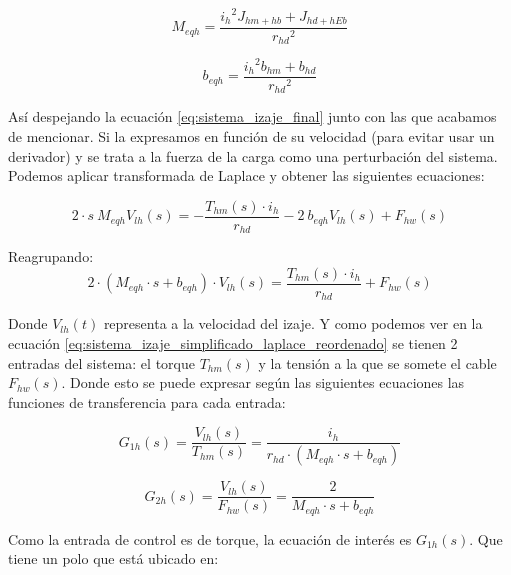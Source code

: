 \documentclass[11pt]{article}
\begin{document}
\begin{equation}
	\label{eq:sistema_izaje_masa_equivalente}
	M_{eqh} = \frac{{i_{h}}^{2}J_{hm+hb}+J_{hd+hEb}}{{r_{hd}}^{2}}
\end{equation}

\begin{equation}
	\label{eq:sistema_izaje_friccion_equivalente}
	b_{eqh} = \frac{{i_{h}}^{2}b_{hm}+b_{hd}}{{r_{hd}}^{2}}
\end{equation}

Así despejando la ecuación \ref{eq:sistema_izaje_final} junto con las que acabamos de mencionar. Si la expresamos en función de su velocidad (para evitar usar un derivador) y se trata a la fuerza de la carga como una perturbación del sistema. Podemos aplicar transformada de Laplace y obtener las siguientes ecuaciones:

\begin{equation}
	\label{eq:sistema_izaje_simplificado_laplace}
	2\cdot s\ M_{eqh} V_{lh}(s)=-\frac{ T_{hm}(s)\cdot i_{h}}{r_{hd}}-2\ b_{eqh} V_{lh}(s)+F_{hw}(s)
\end{equation}

Reagrupando:
\begin{equation}
	\label{eq:sistema_izaje_simplificado_laplace_reordenado}
	2\cdot \left ( M_{eqh}\cdot s+b_{eqh} \right )\cdot V_{lh}(s) = \frac{T_{hm}(s)\cdot i_{h}}{r_{hd}}+ F_{hw}(s)
\end{equation}

Donde $V_{lh}(t)$ representa a la velocidad del izaje. Y como podemos ver en la ecuación \ref{eq:sistema_izaje_simplificado_laplace_reordenado} se tienen 2 entradas del sistema: el torque $T_{hm}(s)$ y la tensión a la que se somete el cable $F_{hw}(s)$. Donde esto se puede expresar según las siguientes ecuaciones las funciones de transferencia para cada entrada:

\begin{equation}
	\label{eq:sistema_izaje_simplificado_laplace_G1h}
	G_{1h}(s)=\frac{V_{lh}(s)}{T_{hm}(s)}=\frac{i_{h}}{r_{hd}\cdot (M_{eqh}\cdot s+b_{eqh})}
\end{equation}

\begin{equation}
	\label{eq:sistema_izaje_simplificado_laplace_G2h}
	G_{2h}(s)=\frac{V_{lh}(s)}{F_{hw}(s)}=\frac{2}{M_{eqh}\cdot s+b_{eqh}}
\end{equation}

Como la entrada de control es de torque, la ecuación de interés es $G_{1h}(s)$. Que tiene un polo que está ubicado en:
\end{document}
